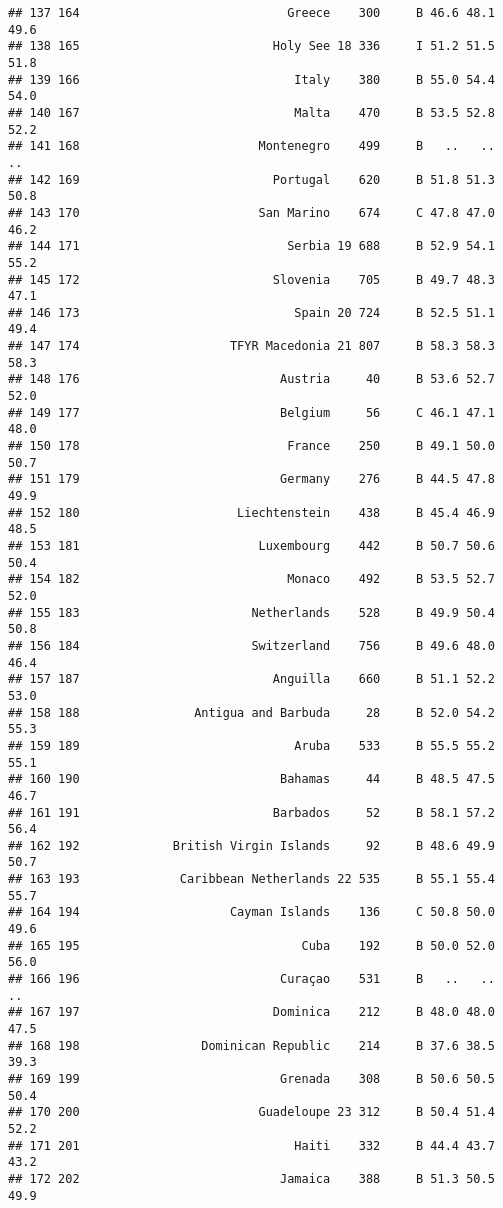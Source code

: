 \documentclass[]{article}
\begin{document}
\begin{verbatim}
## 137 164                             Greece    300     B 46.6 48.1 49.6
## 138 165                           Holy See 18 336     I 51.2 51.5 51.8
## 139 166                              Italy    380     B 55.0 54.4 54.0
## 140 167                              Malta    470     B 53.5 52.8 52.2
## 141 168                         Montenegro    499     B   ..   ..   ..
## 142 169                           Portugal    620     B 51.8 51.3 50.8
## 143 170                         San Marino    674     C 47.8 47.0 46.2
## 144 171                             Serbia 19 688     B 52.9 54.1 55.2
## 145 172                           Slovenia    705     B 49.7 48.3 47.1
## 146 173                              Spain 20 724     B 52.5 51.1 49.4
## 147 174                     TFYR Macedonia 21 807     B 58.3 58.3 58.3
## 148 176                            Austria     40     B 53.6 52.7 52.0
## 149 177                            Belgium     56     C 46.1 47.1 48.0
## 150 178                             France    250     B 49.1 50.0 50.7
## 151 179                            Germany    276     B 44.5 47.8 49.9
## 152 180                      Liechtenstein    438     B 45.4 46.9 48.5
## 153 181                         Luxembourg    442     B 50.7 50.6 50.4
## 154 182                             Monaco    492     B 53.5 52.7 52.0
## 155 183                        Netherlands    528     B 49.9 50.4 50.8
## 156 184                        Switzerland    756     B 49.6 48.0 46.4
## 157 187                           Anguilla    660     B 51.1 52.2 53.0
## 158 188                Antigua and Barbuda     28     B 52.0 54.2 55.3
## 159 189                              Aruba    533     B 55.5 55.2 55.1
## 160 190                            Bahamas     44     B 48.5 47.5 46.7
## 161 191                           Barbados     52     B 58.1 57.2 56.4
## 162 192             British Virgin Islands     92     B 48.6 49.9 50.7
## 163 193              Caribbean Netherlands 22 535     B 55.1 55.4 55.7
## 164 194                     Cayman Islands    136     C 50.8 50.0 49.6
## 165 195                               Cuba    192     B 50.0 52.0 56.0
## 166 196                            Curaçao    531     B   ..   ..   ..
## 167 197                           Dominica    212     B 48.0 48.0 47.5
## 168 198                 Dominican Republic    214     B 37.6 38.5 39.3
## 169 199                            Grenada    308     B 50.6 50.5 50.4
## 170 200                         Guadeloupe 23 312     B 50.4 51.4 52.2
## 171 201                              Haiti    332     B 44.4 43.7 43.2
## 172 202                            Jamaica    388     B 51.3 50.5 49.9

\end{verbatim}
\end{document}
